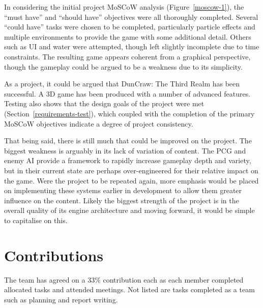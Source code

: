 \documentclass[a4paper, oneside, 11pt]{report}
\begin{document}
In considering the initial project MoSCoW analysis (Figure~\ref{moscow-1}), the ``must have'' and ``should have'' objectives were all thoroughly completed. Several ``could have'' tasks were chosen to be completed, particularly particle effects and multiple environments to provide the game with some additional detail. Others such as UI and water were attempted, though left slightly incomplete due to time constraints. The resulting game appears coherent from a graphical perspective, though the gameplay could be argued to be a weakness due to its simplicity.

As a project, it could be argued that DunCraw: The Third Realm has been successful. A 3D game has been produced with a number of advanced features. Testing also shows that the design goals of the project were met (Section~\ref{requirements-test}), which coupled with the completion of the primary MoSCoW objectives indicate a degree of project consistency.  

That being said, there is still much that could be improved on the project. The biggest weakness is arguably in its lack of variation of content. The PCG and enemy AI provide a framework to rapidly increase gameplay depth and variety, but in their current state are perhaps over-engineered for their relative impact on the game. Were the project to be repeated again, more emphasis would be placed on implementing these systems earlier in development to allow them greater influence on the content. Likely the biggest strength of the project is in the overall quality of its engine architecture and moving forward, it would be simple to capitalise on this.




\chapter*{Contributions}
The team has agreed on a 33\% contribution each as each member completed allocated tasks and attended meetings. Not listed are tasks completed as a team such as planning and report writing.
\end{document}
